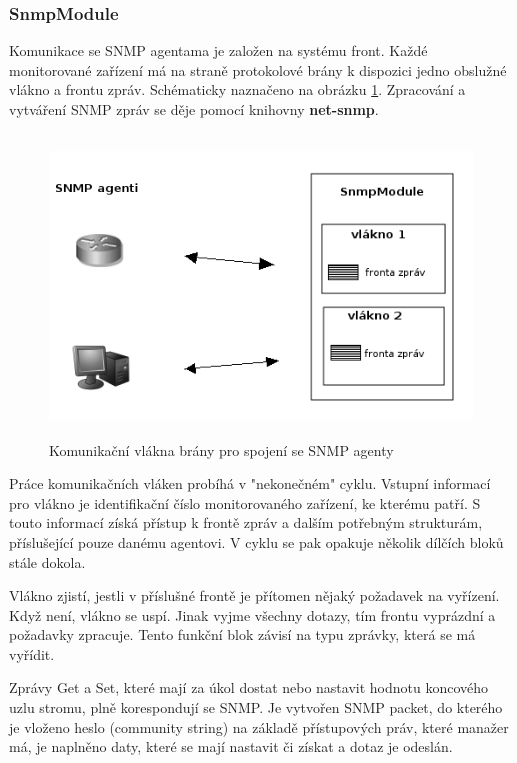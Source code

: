 \subsubsection*{SnmpModule}
Komunikace se SNMP agentama je založen na systému front. Každé monitorované zařízení má na straně protokolové brány k dispozici jedno obslužné vlákno
a frontu zpráv. Schématicky naznačeno na obrázku \ref{obr_impl_snmp_komunikace}. Zpracování a vytváření SNMP zpráv se děje pomocí knihovny \textbf{net-snmp}.
\begin{figure}[htp]
	\begin{center}
		\includegraphics[width=14cm,height=8cm]{obrazky/05_snmp_komunikace.png}
		\caption{Komunikační vlákna brány pro spojení se SNMP agenty}
		\label{obr_impl_snmp_komunikace}
	\end{center}
\end{figure}

Práce komunikačních vláken probíhá v "nekonečném" cyklu. Vstupní informací pro vlákno je identifikační
číslo monitorovaného zařízení, ke kterému patří. S touto informací získá přístup k frontě zpráv a dalším potřebným strukturám, příslušející pouze danému agentovi.
V cyklu se pak opakuje několik dílčích bloků stále dokola.

Vlákno zjistí, jestli v příslušné frontě je přítomen nějaký požadavek na vyřízení. Když není, vlákno se uspí. Jinak vyjme všechny dotazy, tím frontu vyprázdní a
požadavky zpracuje. Tento funkční blok závisí na typu zprávky, která se má vyřídit. 

Zprávy Get a Set, které mají za úkol dostat nebo nastavit hodnotu koncového uzlu stromu, plně korespondují se SNMP. Je vytvořen SNMP packet, do kterého je vloženo
heslo (community string) na základě přístupových práv, které manažer má, je naplněno daty, které se mají nastavit či získat a dotaz je odeslán.

